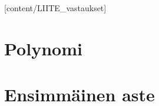[content/LIITE_vastaukset]

\chapter{Polynomi}

	

	

		
		

	
	
	

\chapter{Ensimmäinen aste}
	
	

